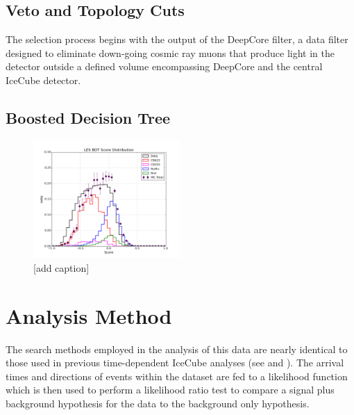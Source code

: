 \documentclass[manuscript]{aastex}
\begin{document}
\subsection{Veto and Topology Cuts}
The selection process begins with the output of the DeepCore filter, a data filter designed to eliminate down-going cosmic ray muons that produce light in the detector outside a defined volume encompassing DeepCore and the central IceCube detector. 
\subsection{Boosted Decision Tree}

\begin{figure}[ht]
  \begin{center}
    \includegraphics[width=0.5\textwidth,keepaspectratio]{plots/LES_BDTScoreDist_NormalizedRates_WC9255_And_H3AC9622_L6.png}
  \end{center}
  \caption[Low-Energy Event Branch BDT Score Distribution]{[add caption]}
  \label{fig:LESBDTDistribution}
\end{figure}

\section{Analysis Method}
The search methods employed in the analysis of this data are nearly identical to those used in previous time-dependent IceCube analyses (see \cite{2008APh....29..299B} and \cite{2015arXiv150300598A}). The arrival times and directions of events within the dataset are fed to a likelihood function which is then used to perform a likelihood ratio test to compare a signal plus background hypothesis for the data to the background only hypothesis.
\end{document}

